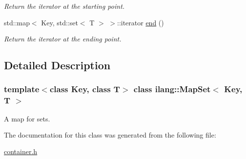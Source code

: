 \begin{DoxyCompactItemize}
\begin{DoxyCompactList}\small\item\em Return the iterator at the starting point. \end{DoxyCompactList}\item 
\mbox{\label{classilang_1_1_map_set_a704419ea4071e2f9e07e6047cbe24bb1}} 
std\+::map$<$ Key, std\+::set$<$ T $>$ $>$\+::iterator \mbox{\hyperlink{classilang_1_1_map_set_a704419ea4071e2f9e07e6047cbe24bb1}{end}} ()
\begin{DoxyCompactList}\small\item\em Return the iterator at the ending point. \end{DoxyCompactList}\end{DoxyCompactItemize}


\subsection{Detailed Description}
\subsubsection*{template$<$class Key, class T$>$\newline
class ilang\+::\+Map\+Set$<$ Key, T $>$}

A map for sets. 

The documentation for this class was generated from the following file\+:\begin{DoxyCompactItemize}
\item 
\mbox{\hyperlink{container_8h}{container.\+h}}\end{DoxyCompactItemize}
